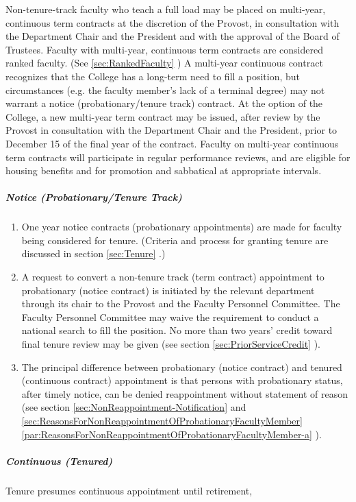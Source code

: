 					Non-tenure-track faculty who teach a full load may be placed on multi-year, continuous term contracts at the discretion of the Provost, in consultation with the Department Chair and the President and with the approval of the Board of Trustees. Faculty with multi-year, continuous term contracts are considered ranked faculty.  (See
					\ref{sec:RankedFaculty}
					)  A multi-year continuous contract recognizes that the College has a long-term need to fill a position, but circumstances (e.g. the faculty member's lack of a terminal degree) may not warrant a notice (probationary/tenure track) contract.  At the option of the College, a new multi-year term contract may be issued, after review by the Provost in consultation with the Department Chair and the President, prior to December 15 of the final year of the contract. Faculty on multi-year continuous term contracts will participate in regular performance reviews, and are eligible for housing benefits and for promotion and sabbatical at appropriate intervals.
				\subparagraph{Notice (Probationary/Tenure Track)}
					\label{sec:TypesOfContract-Notice}
					\begin{enumerate}[label=\alph*)]
						\item{One year notice contracts (probationary appointments) are made for faculty being considered for tenure.  (Criteria and process for granting tenure are discussed in
							section
							\ref{sec:Tenure}
							.)}
						\item{A request to convert a non-tenure track (term contract) appointment to probationary (notice contract) is initiated by the relevant department through its chair to the Provost and the Faculty Personnel Committee.  The Faculty Personnel Committee may waive the requirement to conduct a national search to fill the position.  No more than two years' credit toward final tenure review may be given (see
							section
							\ref{sec:PriorServiceCredit}
							).}
						\item{The principal difference between probationary (notice contract) and tenured (continuous contract) appointment is that persons with probationary status, after timely notice, can be denied reappointment without statement of reason (see
							section
							\ref{sec:NonReappointment-Notification}
							and
							\ref{sec:ReasonsForNonReappointmentOfProbationaryFacultyMember}
							\ref{par:ReasonsForNonReappointmentOfProbationaryFacultyMember-a}
							).}
					\end{enumerate}
				\subparagraph{Continuous (Tenured)}
					Tenure presumes continuous appointment until retirement,
